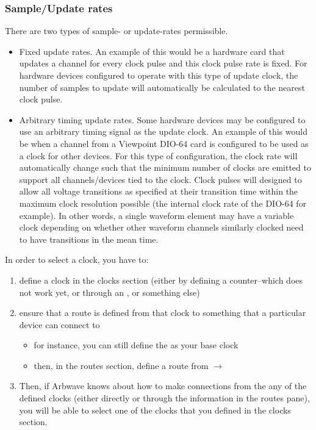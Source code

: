\subsubsection{Sample/Update rates}
There are two types of sample- or update-rates permissible.
\begin{itemize}
\item  Fixed update rates.
  An example of this would be a hardware card that updates a channel for every
  clock pulse and this clock pulse rate is fixed.  For hardware devices
  configured to operate with this type of update clock, the number of samples
  to update will automatically be calculated to the nearest clock pulse.
\item  Arbitrary timing update rates.
  Some hardware devices may be configured to use an arbitrary timing signal as
  the update clock.  An example of this would be when a channel from a
  Viewpoint DIO-64 card is configured to be used as a clock for other devices.
  For this type of configuration, the clock rate will automatically change
  such that the minimum number of clocks are emitted to support all
  channels/devices tied to the clock.  Clock pulses will designed to allow
  all voltage transitions as specified at their transition time within the
  maximum clock resolution possible (the internal clock rate of the DIO-64 for
  example).  In other words, a single waveform element may have a variable
  clock depending on whether other waveform channels similarly clocked need to
  have transitions in the mean time.
\end{itemize}


In order to select a clock, you have to:
\begin{enumerate}
  \item define a clock in the clocks section (either by defining a
    counter--which does not work yet, or through an , or something
    else)
  \item ensure that a route is defined from that clock to something that a
    particular device can connect to
    \begin{itemize}
      \item for instance, you can still define the  as your base
      clock
      \item then, in the routes section, define a route from
       $\rightarrow$ 
    \end{itemize}
  \item Then, if Arbwave knows about how to make connections from the any of the
    defined clocks (either directly or through the information in the routes
    pane), you will be able to select one of the clocks that you defined in the
    clocks section.
\end{enumerate}

